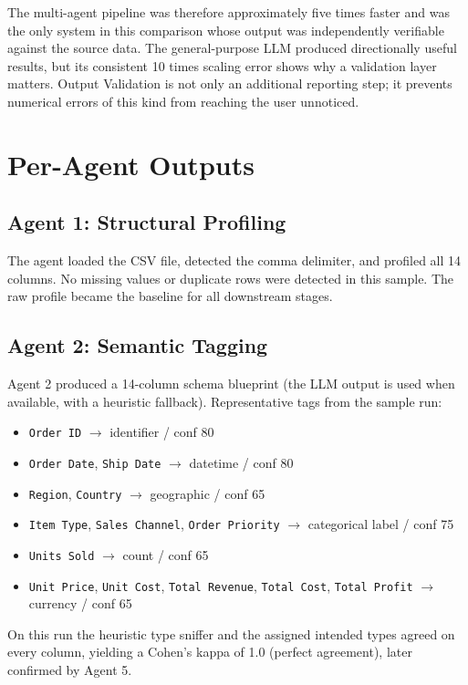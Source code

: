 \documentclass[12pt,a4paper,openany]{report}
\begin{document}
The multi-agent pipeline was therefore approximately five times faster and was the only system in this comparison whose output was independently verifiable against the source data. The general-purpose LLM produced directionally useful results, but its consistent 10 times scaling error shows why a validation layer matters. Output Validation is not only an additional reporting step; it prevents numerical errors of this kind from reaching the user unnoticed.

\section{Per-Agent Outputs}

\subsection{Agent 1: Structural Profiling}
The agent loaded the CSV file, detected the comma delimiter, and profiled all 14 columns. No missing values or duplicate rows were detected in this sample. The raw profile became the baseline for all downstream stages.

\subsection{Agent 2: Semantic Tagging}
Agent 2 produced a 14-column schema blueprint (the LLM output is used when available, with a heuristic fallback). Representative tags from the sample run:
\begin{itemize}
	\item \texttt{Order ID} $\rightarrow$ identifier / conf 80
	\item \texttt{Order Date}, \texttt{Ship Date} $\rightarrow$ datetime / conf 80
	\item \texttt{Region}, \texttt{Country} $\rightarrow$ geographic / conf 65
	\item \texttt{Item Type}, \texttt{Sales Channel}, \texttt{Order Priority} $\rightarrow$ categorical label / conf 75
	\item \texttt{Units Sold} $\rightarrow$ count / conf 65
	\item \texttt{Unit Price}, \texttt{Unit Cost}, \texttt{Total Revenue}, \texttt{Total Cost}, \texttt{Total Profit} $\rightarrow$ currency / conf 65
\end{itemize}
On this run the heuristic type sniffer and the assigned intended types agreed on every column, yielding a Cohen's kappa of 1.0 (perfect agreement), later confirmed by Agent 5.
\end{document}
